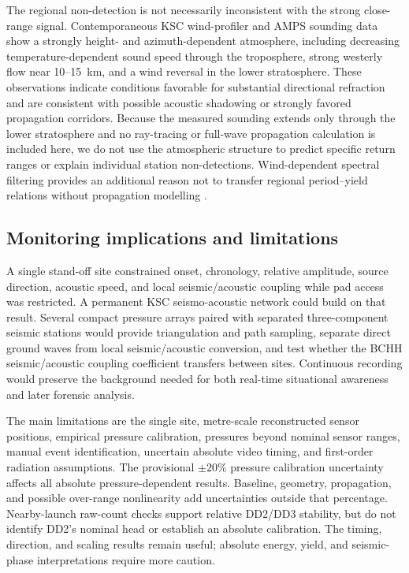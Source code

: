 \documentclass[]{seismica}
\begin{document}
The regional non-detection is not necessarily inconsistent with the strong
close-range signal. Contemporaneous KSC wind-profiler and AMPS sounding data
show a strongly height- and azimuth-dependent atmosphere, including decreasing
temperature-dependent sound speed through the troposphere, strong westerly
flow near 10--15~km, and a wind reversal in the lower stratosphere. These
observations indicate conditions favorable for substantial directional
refraction and are consistent with possible acoustic shadowing or strongly
favored propagation corridors. Because the measured sounding extends only
through the lower stratosphere and no ray-tracing or full-wave propagation
calculation is included here, we do not use the atmospheric structure to
predict specific return ranges or explain individual station
non-detections. Wind-dependent spectral filtering provides an additional
reason not to transfer regional period--yield relations without propagation
modelling \citep{silber_wind_filtering_2026}.

\subsection{Monitoring implications and limitations}

A single stand-off site constrained onset, chronology, relative amplitude,
source direction, acoustic speed, and local seismic/acoustic coupling while pad
access was restricted. A permanent KSC seismo-acoustic network could build on
that result. Several compact pressure arrays paired with separated
three-component seismic stations would provide triangulation and path sampling,
separate direct ground waves from local seismic/acoustic conversion, and test
whether the BCHH seismic/acoustic coupling coefficient transfers between sites. Continuous
recording would preserve the background needed for both real-time situational
awareness and later forensic analysis.

The main limitations are the single site, metre-scale reconstructed sensor
positions, empirical pressure calibration, pressures beyond nominal sensor
ranges, manual event identification, uncertain absolute video timing, and
first-order radiation assumptions. The provisional $\pm20\%$ pressure
calibration uncertainty affects all absolute pressure-dependent results.
Baseline, geometry, propagation, and possible over-range nonlinearity add
uncertainties outside that percentage. Nearby-launch raw-count checks support
relative DD2/DD3 stability, but do not identify DD2's nominal head or establish
an absolute calibration. The timing, direction, and scaling results remain
useful; absolute energy, yield, and seismic-phase interpretations require more
caution.
\end{document}
